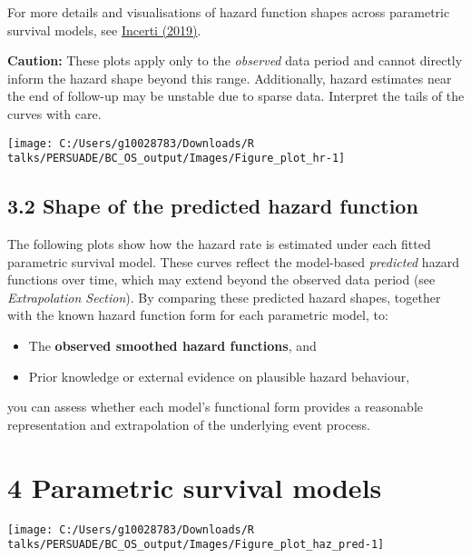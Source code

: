 \documentclass[
]{article}
\providecommand{\tightlist}{%
  \setlength{\itemsep}{0pt}\setlength{\parskip}{0pt}}
\begin{document}
For more details and visualisations of hazard function shapes across
parametric survival models, see
\href{https://devinincerti.com/2019/06/18/parametric_survival.html}{Incerti
(2019)}.

\textbf{Caution:} These plots apply only to the \emph{observed} data
period and cannot directly inform the hazard shape beyond this range.
Additionally, hazard estimates near the end of follow-up may be unstable
due to sparse data. Interpret the tails of the curves with care.

\clearpage

\begin{flushleft}\texttt{[image: C:/Users/g10028783/Downloads/R talks/PERSUADE/BC\_OS\_output/Images/Figure\_plot\_hr-1]} \end{flushleft}

\clearpage

\subsection{3.2 Shape of the predicted hazard
function}\label{shape-of-the-predicted-hazard-function}

The following plots show how the hazard rate is estimated under each
fitted parametric survival model. These curves reflect the model-based
\emph{predicted} hazard functions over time, which may extend beyond the
observed data period (see \emph{Extrapolation Section}). By comparing
these predicted hazard shapes, together with the known hazard function
form for each parametric model, to:

\begin{itemize}
\tightlist
\item
  The \textbf{observed smoothed hazard functions}, and\\
\item
  Prior knowledge or external evidence on plausible hazard behaviour,
\end{itemize}

you can assess whether each model's functional form provides a
reasonable representation and extrapolation of the underlying event
process.

\clearpage

\section{4 Parametric survival models}\label{parametric-survival-models}

\begin{flushleft}\texttt{[image: C:/Users/g10028783/Downloads/R talks/PERSUADE/BC\_OS\_output/Images/Figure\_plot\_haz\_pred-1]} \end{flushleft}
\end{document}
